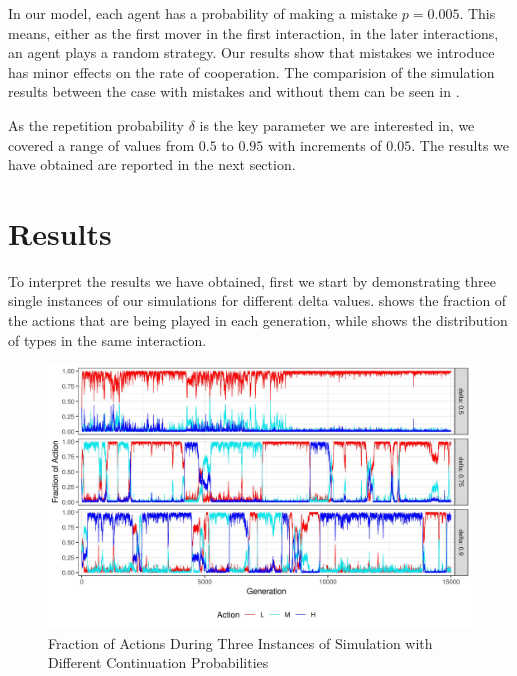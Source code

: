 \documentclass[12pt]{article}
\begin{document}
 In our model, each agent has a probability of making a mistake $p = 0.005$. This means, either as the first mover in the first interaction, in the later interactions, an agent plays a random strategy. Our results show that mistakes we introduce has minor effects on the rate of cooperation. The comparision of the simulation results between the case with mistakes and without them can be seen in .

 As the repetition probability $\delta$ is the key parameter we are interested in, we covered a range of values from $0.5$ to $0.95$ with increments of $0.05$. The results we have obtained are reported in the next section.



\section{Results}
\label{sec:results}

To interpret the results we have obtained, first we start by demonstrating three single instances of our simulations for different delta values.  shows the fraction of the actions that are being played in each generation, while  shows the distribution of types in the same interaction.   
\begin{figure}[H]
	\centering
	\includegraphics[width=1\linewidth]{img/actions_singlerun2}
	\caption[Fraction of Actions During Three Instances]{Fraction of Actions During Three Instances of Simulation with Different Continuation Probabilities}
	\label{fig:evo-actionssingle}
\end{figure}
\end{document}
